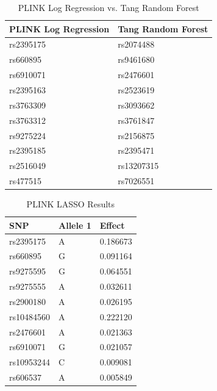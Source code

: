 \documentclass[12pt]{report}
\begin{document}
\begin{table}[!ht]
\centering
\caption{PLINK Log Regression vs. Tang Random Forest}
\label{Table 1}
\begin{tabular}{@{}ll@{}}
\toprule
PLINK Log Regression & Tang Random Forest \\ \midrule
\cellcolor{PaleTurquoise2}rs2395175            & rs2074488          \\
rs660895             & rs9461680          \\
rs6910071            & \cellcolor{PaleGreen2}rs2476601          \\
rs2395163            & rs2523619          \\
rs3763309            & rs3093662          \\
rs3763312            & rs3761847          \\
rs9275224            & rs2156875          \\
rs2395185            & rs2395471          \\
rs2516049            & rs13207315         \\
rs477515             & rs7026551          \\ \bottomrule
\end{tabular}
\end{table}

\begin{table}[ht]
\centering
\caption{PLINK LASSO Results}
\label{Table 2}
\begin{tabular}{@{}lll@{}}
\toprule
SNP        & Allele 1 & Effect   \\ \midrule
\cellcolor{PaleTurquoise2}rs2395175  & A        & 0.186673 \\
rs660895   & G        & 0.091164 \\
rs9275595  & G        & 0.064551 \\
rs9275555  & A        & 0.032611 \\
rs2900180  & A        & 0.026195 \\
rs10484560 & A        & 0.222120 \\
\cellcolor{PaleGreen2}rs2476601  & A        & 0.021363 \\
rs6910071  & G        & 0.021057 \\
rs10953244 & C        & 0.009081 \\
rs606537   & A        & 0.005849 \\ \bottomrule
\end{tabular}
\end{table}
\end{document}
